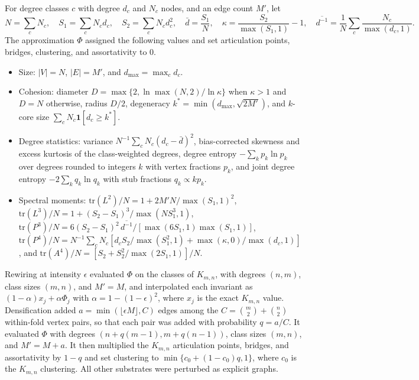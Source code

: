 \documentclass{article}
\begin{document}
For degree classes $c$ with degree $d_c$ and $N_c$ nodes, and an edge count $M'$, let
\begin{equation*}
N = \sum_c N_c, \quad S_1 = \sum_c N_c d_c, \quad S_2 = \sum_c N_c d_c^{2}, \quad \bar{d} = \frac{S_1}{N}, \quad \kappa = \frac{S_2}{\max(S_1, 1)} - 1, \quad \overline{d^{-1}} = \frac{1}{N} \sum_c \frac{N_c}{\max(d_c, 1)}.
\end{equation*}
The approximation $\Phi$ assigned the following values and set articulation points, bridges, clustering, and assortativity to 0.
\begin{itemize}[leftmargin=1.5em,itemsep=0.2em]
\item Size: $|V| = N$, $|E| = M'$, and $d_{\max} = \max_c d_c$.
\item Cohesion: diameter $D = \max\{2, \ln \max(N, 2) / \ln \kappa\}$ when $\kappa > 1$ and $D = N$ otherwise, radius $D/2$, degeneracy $k^{*} = \min(d_{\max}, \sqrt{2M'})$, and $k$-core size $\sum_c N_c \mathbf{1}[d_c \ge k^{*}]$.
\item Degree statistics: variance $N^{-1} \sum_c N_c (d_c - \bar{d})^2$, bias-corrected skewness and excess kurtosis of the class-weighted degrees, degree entropy $-\sum_k p_k \ln p_k$ over degrees rounded to integers $k$ with vertex fractions $p_k$, and joint degree entropy $-2 \sum_k q_k \ln q_k$ with stub fractions $q_k \propto k p_k$.
\item Spectral moments: $\mathrm{tr}(L^2)/N = 1 + 2M'N / \max(S_1, 1)^2$, $\mathrm{tr}(L^3)/N = 1 + (S_2 - S_1)^3 / \max(N S_1^3, 1)$, $\mathrm{tr}(P^3)/N = 6 (S_2 - S_1)^2\, \overline{d^{-1}} / [\max(6 S_1, 1) \max(S_1, 1)]$, $\mathrm{tr}(P^4)/N = N^{-1} \sum_c N_c [d_c S_2 / \max(S_1^2, 1) + \max(\kappa, 0) / \max(d_c, 1)]$, and $\mathrm{tr}(A^4)/N = [S_2 + S_2^2 / \max(2 S_1, 1)] / N$.
\end{itemize}
Rewiring at intensity $\epsilon$ evaluated $\Phi$ on the classes of $K_{m,n}$, with degrees $(n, m)$, class sizes $(m, n)$, and $M' = M$, and interpolated each invariant as $(1 - \alpha) x_j + \alpha \Phi_j$ with $\alpha = 1 - (1 - \epsilon)^2$, where $x_j$ is the exact $K_{m,n}$ value. Densification added $a = \min(\lfloor \epsilon M \rfloor, C)$ edges among the $C = \binom{m}{2} + \binom{n}{2}$ within-fold vertex pairs, so that each pair was added with probability $q = a / C$. It evaluated $\Phi$ with degrees $(n + q(m - 1), m + q(n - 1))$, class sizes $(m, n)$, and $M' = M + a$. It then multiplied the $K_{m,n}$ articulation points, bridges, and assortativity by $1 - q$ and set clustering to $\min\{c_0 + (1 - c_0) q, 1\}$, where $c_0$ is the $K_{m,n}$ clustering. All other substrates were perturbed as explicit graphs.
\end{document}
